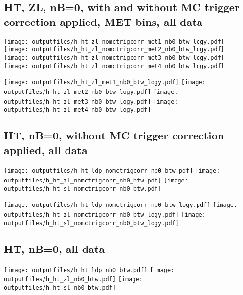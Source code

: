 \documentclass[11pt]{article}
\begin{document}
   \clearpage
     \subsection{ HT, ZL, nB=0, with and without MC trigger correction applied, MET bins, all data}

    \noindent
     \texttt{[image: outputfiles/h\_ht\_zl\_nomctrigcorr\_met1\_nb0\_btw\_logy.pdf]}
     \texttt{[image: outputfiles/h\_ht\_zl\_nomctrigcorr\_met2\_nb0\_btw\_logy.pdf]}
     \texttt{[image: outputfiles/h\_ht\_zl\_nomctrigcorr\_met3\_nb0\_btw\_logy.pdf]}
     \texttt{[image: outputfiles/h\_ht\_zl\_nomctrigcorr\_met4\_nb0\_btw\_logy.pdf]}

    \noindent
     \texttt{[image: outputfiles/h\_ht\_zl\_met1\_nb0\_btw\_logy.pdf]}
     \texttt{[image: outputfiles/h\_ht\_zl\_met2\_nb0\_btw\_logy.pdf]}
     \texttt{[image: outputfiles/h\_ht\_zl\_met3\_nb0\_btw\_logy.pdf]}
     \texttt{[image: outputfiles/h\_ht\_zl\_met4\_nb0\_btw\_logy.pdf]}

   \clearpage
    \subsection{ HT, nB=0, without MC trigger correction applied, all data}

    \noindent
    \texttt{[image: outputfiles/h\_ht\_ldp\_nomctrigcorr\_nb0\_btw.pdf]}
    \texttt{[image: outputfiles/h\_ht\_zl\_nomctrigcorr\_nb0\_btw.pdf]}
    \texttt{[image: outputfiles/h\_ht\_sl\_nomctrigcorr\_nb0\_btw.pdf]}

    \noindent
    \texttt{[image: outputfiles/h\_ht\_ldp\_nomctrigcorr\_nb0\_btw\_logy.pdf]}
    \texttt{[image: outputfiles/h\_ht\_zl\_nomctrigcorr\_nb0\_btw\_logy.pdf]}
    \texttt{[image: outputfiles/h\_ht\_sl\_nomctrigcorr\_nb0\_btw\_logy.pdf]}


    \subsection{ HT, nB=0, all data}

    \noindent
    \texttt{[image: outputfiles/h\_ht\_ldp\_nb0\_btw.pdf]}
    \texttt{[image: outputfiles/h\_ht\_zl\_nb0\_btw.pdf]}
    \texttt{[image: outputfiles/h\_ht\_sl\_nb0\_btw.pdf]}
\end{document}
